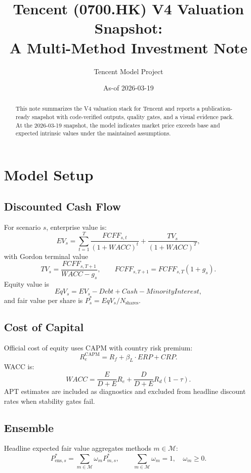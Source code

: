 \documentclass[11pt]{article}
\title{Tencent (0700.HK) V4 Valuation Snapshot:\\A Multi-Method Investment Note}
\author{Tencent Model Project}
\date{As-of 2026-03-19}
\begin{document}
\maketitle

\begin{abstract}
This note summarizes the V4 valuation stack for Tencent and reports a publication-ready
snapshot with code-verified outputs, quality gates, and a visual evidence pack.
At the 2026-03-19 snapshot, the model indicates market price exceeds base and
expected intrinsic values under the maintained assumptions.
\end{abstract}

\section{Model Setup}

\subsection{Discounted Cash Flow}
For scenario $s$, enterprise value is:
\begin{equation}
EV_s = \sum_{t=1}^{T} \frac{FCFF_{s,t}}{(1+WACC)^t}
+ \frac{TV_s}{(1+WACC)^T},
\end{equation}
with Gordon terminal value
\begin{equation}
TV_s = \frac{FCFF_{s,T+1}}{WACC - g_s}, \qquad FCFF_{s,T+1}=FCFF_{s,T}(1+g_s).
\end{equation}
Equity value is
\begin{equation}
EqV_s = EV_s - Debt + Cash - MinorityInterest,
\end{equation}
and fair value per share is $P^{\ast}_s = EqV_s/N_{\text{shares}}$.

\subsection{Cost of Capital}
Official cost of equity uses CAPM with country risk premium:
\begin{equation}
R_e^{\mathrm{CAPM}} = R_f + \beta_L \cdot ERP + CRP.
\end{equation}
WACC is:
\begin{equation}
WACC = \frac{E}{D+E}R_e + \frac{D}{D+E}R_d(1-\tau).
\end{equation}
APT estimates are included as diagnostics and excluded from headline discount rates when
stability gates fail.

\subsection{Ensemble}
Headline expected fair value aggregates methods $m \in \mathcal{M}$:
\begin{equation}
P^{\ast}_{\text{ens},s} = \sum_{m \in \mathcal{M}} \omega_m P^{\ast}_{m,s},
\qquad \sum_{m \in \mathcal{M}} \omega_m = 1,\quad \omega_m \ge 0.
\end{equation}
\end{document}

